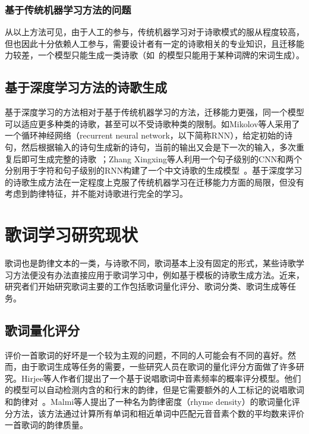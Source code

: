 \subsubsection{基于传统机器学习方法的问题}
从以上方法可见，由于人工的参与，传统机器学习对于诗歌模式的服从程度较高，但也因此十分依赖人工参与，需要设计者有一定的诗歌相关的专业知识，且迁移能力较差，一个模型只能生成一类诗歌（如~\cite{jiang2015jiyu}的模型只能用于某种词牌的宋词生成）。\par

\subsection{基于深度学习方法的诗歌生成}
基于深度学习的方法相对于基于传统机器学习的方法，迁移能力更强，同一个模型可以适应更多种类的诗歌，甚至可以不受诗歌种类的限制。如Mikolov等人采用了一个循环神经网络（recurrent neural network，以下简称RNN），给定初始的诗句，然后根据输入的诗句生成新的诗句，当前的输出又会是下一次的输入，多次重复后即可生成完整的诗歌~\cite{mikolov2010recurrent}；Zhang Xingxing等人利用一个句子级别的CNN和两个分别用于字符和句子级别的RNN构建了一个中文诗歌的生成模型~\cite{zhang2014chinese}。基于深度学习的诗歌生成方法在一定程度上克服了传统机器学习在迁移能力方面的局限，但没有考虑到韵律特征，并不能对诗歌进行完全的学习。\par

\section{歌词学习研究现状}
歌词也是韵律文本的一类，与诗歌不同，歌词基本上没有固定的形式，某些诗歌学习方法便没有办法直接应用于歌词学习中，例如基于模板的诗歌生成方法。近来，研究者们开始研究歌词主要的工作包括歌词量化评分、歌词分类、歌词生成等任务。\par

\subsection{歌词量化评分}
评价一首歌词的好坏是一个较为主观的问题，不同的人可能会有不同的喜好。然而，由于歌词生成等任务的需要，一些研究人员在歌词的量化评分方面做了许多研究。Hirjee等人作者们提出了一个基于说唱歌词中音素频率的概率评分模型。他们的模型可以自动检测内含的和行末的韵律，但是它需要额外的人工标记的说唱歌词和韵律对~\cite{hirjee2009automatic}。Malmi等人提出了一种名为韵律密度（rhyme density）的歌词量化评分方法，该方法通过计算所有单词和相近单词中匹配元音音素个数的平均数来评价一首歌词的韵律质量。\par

